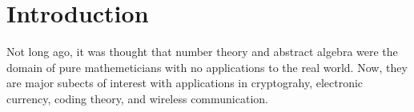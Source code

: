 \chapter{Introduction}
Not long ago, it was thought that number theory and abstract algebra were the
domain of pure mathemeticians with no applications to the real world. Now, they
are major subects of interest with applications in cryptograhy, electronic
currency, coding theory, and wireless communication.

